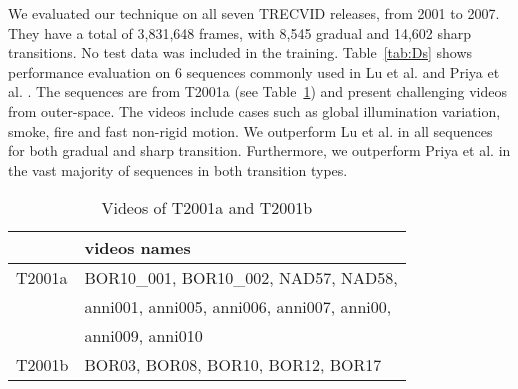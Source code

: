 \documentclass[journal]{IEEEtran}
\begin{document}
We evaluated our technique on all seven TRECVID releases, from 2001 to 2007. They have a total of 3,831,648 frames, with 8,545 gradual and 14,602 sharp transitions. No test data was included in the training. Table~\ref{tab:Ds} shows performance evaluation on 6 sequences commonly used in Lu et al. \cite{Lu13} and Priya et al. \cite{Priya14}. The sequences are from T2001a (see Table~\ref{tab:2001ab}) and present challenging videos from outer-space. The videos include cases such as global illumination variation, smoke, fire and fast non-rigid motion. We outperform Lu et al. in all sequences for both gradual and sharp transition. Furthermore, we outperform Priya et al. in the vast majority of sequences in both transition types. 

\begin{table}
\centering
\small
\begin{tabular}{|l | l |}
     \hline      
												                   & videos names       \\
			\hline 
				 T2001a                        & BOR10\_001, BOR10\_002, NAD57, NAD58, \\
				                               & anni001, anni005, anni006, anni007, anni00, \\
																			 & anni009, anni010   \\ 
						\hline															
				 T2001b                           & BOR03, BOR08, BOR10, BOR12, BOR17 \\ 
			\hline
    \end{tabular}\vspace{3pt}
\caption{Videos of T2001a and T2001b}
\label{tab:2001ab}
\end{table}
\end{document}
